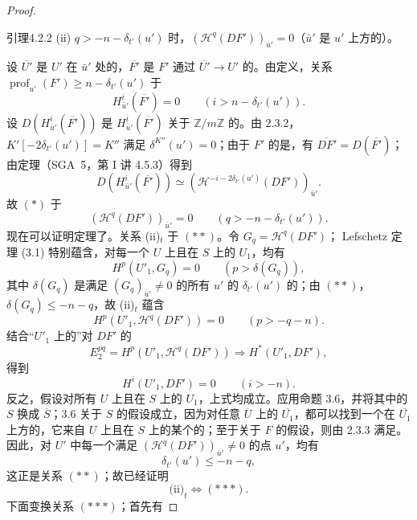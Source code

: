 \begin{proof}
\begin{SGAresult}{引理}{4.2.2}
(ii) $q>-n-\delta_{t'}(u')$ 时，$(\mathcal H^q(DF'))_{\bar u'}=0$（$\bar u'$ 是 $u'$ 上方的）。
\end{SGAresult}
设 $\overline{U'}$ 是 $U'$ 在 $\bar u'$ 处的，$\overline{F'}$ 是 $F'$ 通过 $\overline{U'}\to U'$ 的。由定义，关系 $\operatorname{prof}_{u'}(F')\geq n-\delta_{t'}(u')$ 于
\[
H^i_{\bar u'}(\overline{F'})=0\qquad(i>n-\delta_{t'}(u')).\tag{*}
\]
设 $D(H^i_{\bar u'}(\overline{F'}))$ 是 $H^i_{\bar u'}(\overline{F'})$ 关于 $\mathbb Z/m\mathbb Z$ 的。由 2.3.2，$K'[-2\delta_{t'}(u')]=K''$ 满足 $\delta^{K''}(u')=0$；由于 $F'$ 的是，有 $\overline{DF'}=D(\overline{F'})$；由定理（SGA~5，第 I 讲 4.5.3）得到
\[
D(H^i_{\bar u'}(\overline{F'}))\simeq
(\mathcal H^{-i-2\delta_{t'}(u')}(DF'))_{\bar u'}.
\]
故 $(*)$ 于
\[
(\mathcal H^q(DF'))_{\bar u'}=0\qquad(q>-n-\delta_{t'}(u')).\tag{**}
\]
现在可以证明定理了。关系 (ii)$_t$ 于 $(**)$。令 $G_q=\mathcal H^q(DF')$； Lefschetz 定理 (3.1) 特别蕴含，对每一个 $U$ 上且在 $S$ 上的 $U_1$，均有
\[
H^p(U'_1,G_q)=0\qquad(p>\delta(G_q)),
\]
其中 $\delta(G_q)$ 是满足 $(G_q)_{\bar u'}\ne0$ 的所有 $u'$ 的 $\delta_{t'}(u')$ 的；由 $(**)$，$\delta(G_q)\leq-n-q$，故 (ii)$_t$ 蕴含
\[
H^p(U'_1,\mathcal H^q(DF'))=0\qquad(p>-q-n).
\]
结合“$U'_1$ 上的”对 $DF'$ 的
\[
E_2^{pq}=H^p(U'_1,\mathcal H^q(DF'))\Longrightarrow H^*(U'_1,DF'),
\]
得到
\[
H^i(U'_1,DF')=0\qquad(i>-n).\tag{***}
\]
反之，假设对所有 $U$ 上且在 $S$ 上的 $U_1$，上式均成立。应用命题 3.6，并将其中的 $S$ 换成 $\overline S$；3.6 关于 $S$ 的假设成立，因为对任意 $\overline U$ 上的 $\overline{U_1}$，都可以找到一个在 $\overline{U_1}$ 上方的，它来自 $U$ 上且在 $S$ 上的某个的；至于关于 $F$ 的假设，则由 2.3.3 满足。因此，对 $U'$ 中每一个满足 $(\mathcal H^q(DF'))_{\bar u'}\ne0$ 的点 $u'$，均有
\[
\delta_{t'}(u')\leq-n-q,
\]
这正是关系 $(**)$；故已经证明
\[
\text{(ii)}_t\Longleftrightarrow(***).
\]
下面变换关系 $(***)$；首先有

\end{proof}
